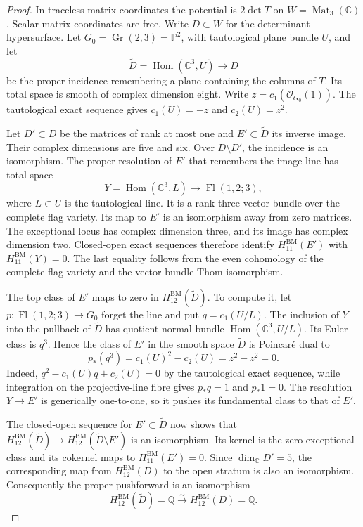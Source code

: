 \begin{proof}
In traceless matrix coordinates the potential is $2\det T$ on
$W=\operatorname{Mat}_3(\mathbb C)$. Scalar matrix coordinates
are free. Write $D\subset W$ for the determinant hypersurface.
Let $G_0=\operatorname{Gr}(2,3)=\mathbb P^2$, with tautological
plane bundle $U$, and let
\[
 \widetilde D=\operatorname{Hom}(\mathbb C^3,U)
      \longrightarrow D
\]
be the proper incidence remembering a plane containing the columns
of $T$. Its total space is smooth of complex dimension eight.
Write $z=c_1(\mathcal O_{G_0}(1))$. The tautological exact sequence
gives $c_1(U)=-z$ and $c_2(U)=z^2$.

Let $D'\subset D$ be the matrices of rank at most one and
$E'\subset\widetilde D$ its inverse image. Their complex dimensions
are five and six. Over $D\setminus D'$, the incidence is an
isomorphism. The proper resolution of $E'$ that remembers the
image line has total space
\[
 Y=\operatorname{Hom}(\mathbb C^3,L)
       \longrightarrow\operatorname{Fl}(1,2;3),
\]
where $L\subset U$ is the tautological line.
It is a rank-three vector bundle over the complete flag variety.
Its map to $E'$ is an isomorphism away from zero matrices.
The exceptional locus has complex dimension three, and its image
has complex dimension two. Closed-open exact sequences therefore
identify $H^{\mathrm{BM}}_{11}(E')$ with
$H^{\mathrm{BM}}_{11}(Y)=0$.
The last equality follows from the even cohomology of the complete
flag variety and the vector-bundle Thom isomorphism.

The top class of $E'$ maps to zero in
$H^{\mathrm{BM}}_{12}(\widetilde D)$.
To compute it, let
$p:\operatorname{Fl}(1,2;3)\to G_0$ forget the line and put
$q=c_1(U/L)$. The inclusion of $Y$ into the pullback of
$\widetilde D$ has quotient normal bundle
$\operatorname{Hom}(\mathbb C^3,U/L)$.
Its Euler class is $q^3$. Hence the class of $E'$ in the smooth
space $\widetilde D$ is Poincar\'e dual to
\[
 p_*(q^3)=c_1(U)^2-c_2(U)=z^2-z^2=0.
\]
Indeed, $q^2-c_1(U)q+c_2(U)=0$ by the tautological exact sequence,
while integration on the projective-line fibre gives $p_*q=1$
and $p_*1=0$. The resolution $Y\to E'$ is generically one-to-one,
so it pushes its fundamental class to that of $E'$.

The closed-open sequence for $E'\subset\widetilde D$ now shows
that
$H^{\mathrm{BM}}_{12}(\widetilde D)\to
 H^{\mathrm{BM}}_{12}(\widetilde D\setminus E')$
is an isomorphism. Its kernel is the zero exceptional class and
its cokernel maps to $H^{\mathrm{BM}}_{11}(E')=0$.
Since $\dim_{\mathbb C}D'=5$, the corresponding map from
$H^{\mathrm{BM}}_{12}(D)$ to the open stratum is also an isomorphism.
Consequently the proper pushforward is an isomorphism
\[
 H^{\mathrm{BM}}_{12}(\widetilde D)=\mathbb Q
       \xrightarrow{\sim}H^{\mathrm{BM}}_{12}(D)=\mathbb Q.
\]


\end{proof}
